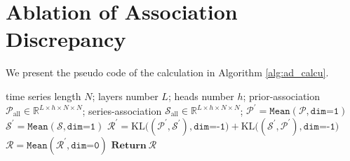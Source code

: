 \documentclass{article} %
\begin{document}
\section{Ablation of Association Discrepancy}\label{sec:app_definition}
We present the pseudo code of the calculation in Algorithm \ref{alg:ad_calcu}.
\begin{algorithm*}[hbp]
  \caption{Association Discrepancy $\mathrm{AssDis}(\mathcal{P},\mathcal{S};\mathcal{X})$ Calculation (multi-head version). }
  \label{alg:ad_calcu}  
  \begin{algorithmic}[1]
    \Require  
   time series length $N$; layers number $L$; heads number $h$; prior-association $\mathcal{P}_{\text{all}}\in\mathbb{R}^{L\times h\times N \times N}$; series-association $\mathcal{S}_{\text{all}}\in\mathbb{R}^{L \times h\times N \times N}$;
    \State $\mathcal{P}^\prime=\texttt{Mean}(\mathcal{P}, \texttt{dim=1})$ 
    \State $\mathcal{S}^\prime=\texttt{Mean}(\mathcal{S}, \texttt{dim=1})$ 
    \State $\mathcal{R}^\prime=\text{KL}\Big((\mathcal{P}^\prime, \mathcal{S}^\prime), \texttt{dim=-1}\Big)+\text{KL}\Big((\mathcal{S}^\prime, \mathcal{P}^\prime), \texttt{dim=-1}\Big)$ 
    \State $\mathcal{R}=\texttt{Mean}(\mathcal{R}^\prime, \texttt{dim=0})$ 
    \State $\textbf{Return}\ \mathcal{R}$
  \end{algorithmic}  
\end{algorithm*}
\vspace{-5pt}
\end{document}
